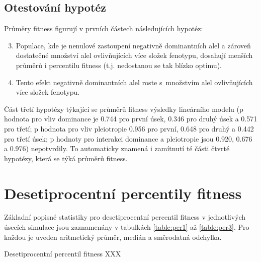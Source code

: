 \subsection{Otestování hypotéz}

Průměry fitness figurují v prvních částech následujících hypotéz:

\begin{enumerate}
    \setcounter{enumi}{2}
    \item{Populace, kde je nenulové zastoupení negativně dominantních alel a zároveň dostatečné množství
          alel ovlivňujících více složek fenotypu, dosahují menších průměrů i percentilu fitness (t.j.
          nedostanou se tak blízko optimu).}
    \item{Tento efekt negativně dominantních alel roste s množstvím alel ovlivňujících více složek fenotypu.}
\end{enumerate}

Část třetí hypotézy týkající se průměrů fitness výsledky lineárního modelu (p hodnota pro vliv dominance je 0.744 pro první úsek,
0.346 pro druhý úsek a 0.571 pro třetí; p hodnota pro vliv pleiotropie 0.956 pro první, 0.648 pro druhý a
0.442 pro třetí úsek; p hodnoty pro interakci dominance a pleiotropie jsou 0.920, 0.676 a 0.976) nepotvrdily.
To automaticky znamená i zamítnutí té části čtvrté hypotézy, která se týká průměrů fitness.


\section{Desetiprocentní percentily fitness}

Základní popisné statistiky pro desetiprocentní percentil fitness v jednotlivých úsecích simulace
jsou zaznamenány v tabulkách \ref{table:per1} až \ref{table:per3}. Pro každou je uveden aritmetický průměr, medián a
směrodatná odchylka.

Desetiprocentní percentil fitness XXX

